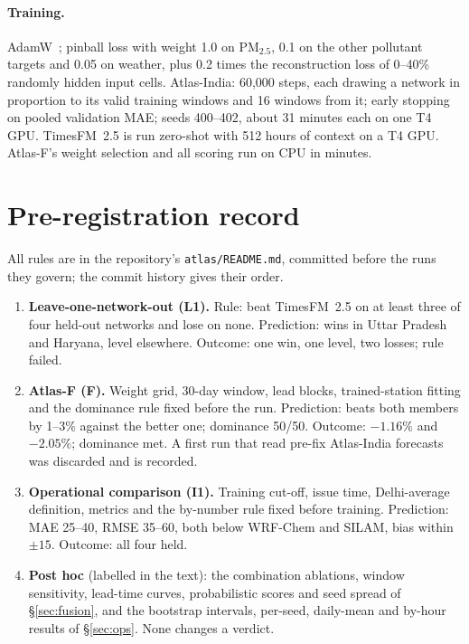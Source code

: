 \documentclass{article}
\newcommand{\pmtf}{PM$_{2.5}$}
\begin{document}
\paragraph{Training.} AdamW~\citep{loshchilov2019adamw}; pinball loss with weight 1.0 on \pmtf{}, 0.1 on the other
pollutant targets and 0.05 on weather, plus 0.2 times the reconstruction loss of 0--40\% randomly hidden input cells.
Atlas-India: 60{,}000 steps, each drawing a network in proportion to its valid training windows and 16 windows from
it; early stopping on pooled validation MAE; seeds 400--402, about 31 minutes each on one T4 GPU. TimesFM~2.5 is run
zero-shot with 512 hours of context on a T4 GPU. Atlas-F's weight selection and all scoring run on CPU in minutes.

\section{Pre-registration record}
\label{app:prereg}

All rules are in the repository's \texttt{atlas/README.md}, committed before the runs they govern; the commit history
gives their order.
\begin{enumerate}
\item \textbf{Leave-one-network-out (L1).} Rule: beat TimesFM~2.5 on at least three of four held-out networks and lose
  on none. Prediction: wins in Uttar Pradesh and Haryana, level elsewhere. Outcome: one win, one level, two losses;
  rule failed.
\item \textbf{Atlas-F (F).} Weight grid, 30-day window, lead blocks, trained-station fitting and the dominance rule fixed
  before the run. Prediction: beats both members by 1--3\% against the better one; dominance 50/50. Outcome: $-1.16\%$
  and $-2.05\%$; dominance met. A first run that read pre-fix Atlas-India forecasts was discarded and is recorded.
\item \textbf{Operational comparison (I1).} Training cut-off, issue time, Delhi-average definition, metrics and the
  by-number rule fixed before training. Prediction: MAE 25--40, RMSE 35--60, both below WRF-Chem and SILAM, bias within
  $\pm15$. Outcome: all four held.
\item \textbf{Post hoc} (labelled in the text): the combination ablations, window sensitivity, lead-time curves,
  probabilistic scores and seed spread of \S\ref{sec:fusion}, and the bootstrap intervals, per-seed, daily-mean and
  by-hour results of \S\ref{sec:ops}. None changes a verdict.
\end{enumerate}
\end{document}

